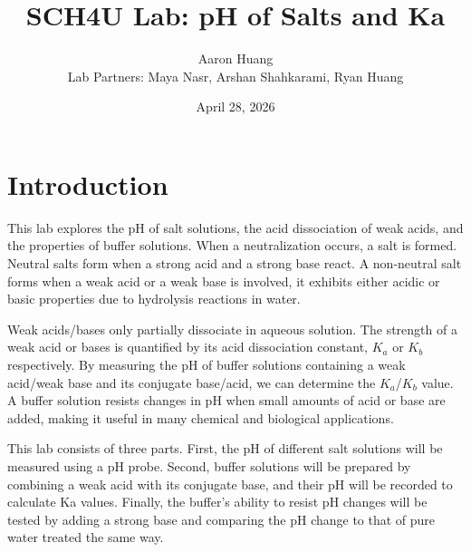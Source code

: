 \documentclass{article}
\begin{document}
\title{SCH4U Lab: pH of Salts and Ka}
\author{Aaron Huang \\
Lab Partners: Maya Nasr, Arshan Shahkarami, Ryan Huang}
\date{April 28, 2026}
\maketitle


\section*{Introduction}

This lab explores the pH of salt solutions, the acid dissociation of weak acids, and the properties of buffer solutions. When a neutralization occurs, a salt is formed. Neutral salts form when a strong acid and a strong base react. A non-neutral salt forms when a weak acid or a weak base is involved, it exhibits either acidic or basic properties due to hydrolysis reactions in water. 

Weak acids/bases only partially dissociate in aqueous solution. The strength of a weak acid or bases is quantified by its acid dissociation constant, $K_a$ or $K_b$ respectively. By measuring the pH of buffer solutions containing a weak acid/weak base and its conjugate base/acid, we can determine the $K_a$/$K_b$ value. A buffer solution resists changes in pH when small amounts of acid or base are added, making it useful in many chemical and biological applications.

This lab consists of three parts. First, the pH of different salt solutions will be measured using a pH probe. Second, buffer solutions will be prepared by combining a weak acid with its conjugate base, and their pH will be recorded to calculate Ka values. Finally, the buffer's ability to resist pH changes will be tested by adding a strong base and comparing the pH change to that of pure water treated the same way.
\end{document}
